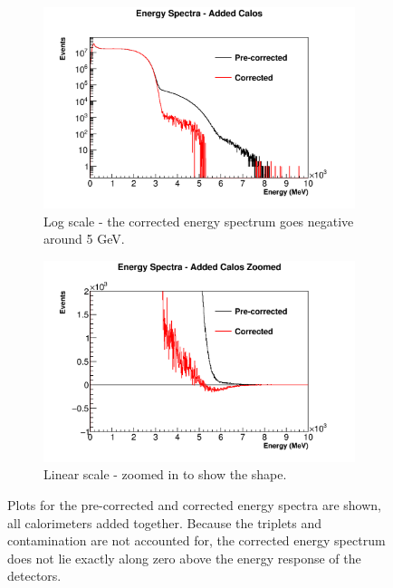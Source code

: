 	\begin{figure}[]
	\centering
	    \begin{subfigure}[]{0.8\textwidth}
		    \centering
			\includegraphics[width=\textwidth]{AddedEnergies}
		    \caption{Log scale - the corrected energy spectrum goes negative around 5 GeV.}
	    \end{subfigure}%
	    \vspace{1cm}
	    \begin{subfigure}[]{0.8\textwidth}
		    \centering
			\includegraphics[width=\textwidth]{AddedEnergiesZoomed}
		    \caption{Linear scale - zoomed in to show the shape.}
	    \end{subfigure}
	\caption[AddedEnergies]{Plots for the pre-corrected and corrected energy spectra are shown, all calorimeters added together. Because the triplets and contamination are not accounted for, the corrected energy spectrum does not lie exactly along zero above the energy response of the detectors.}
	\label{fig:AddedEnergies}
	\end{figure}

